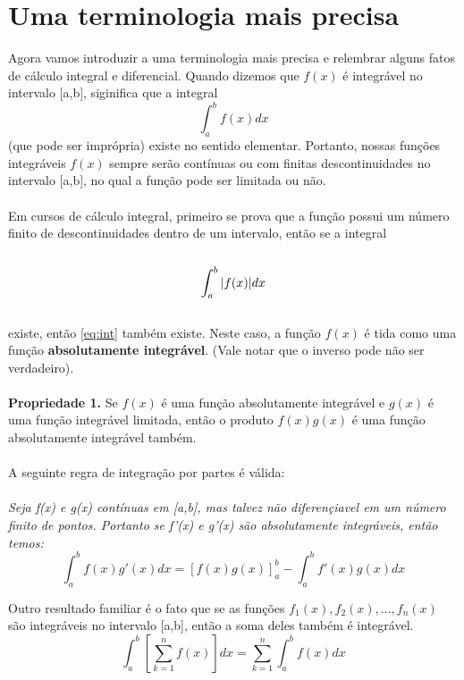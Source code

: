 \chapter{ Uma terminologia mais precisa}
Agora vamos introduzir a uma terminologia mais precisa e relembrar alguns fatos
de cálculo integral e diferencial. Quando dizemos que $f(x)$ é integrável no 
intervalo [a,b], siginifica que a integral\\
\begin{equation}
    \int_{a}^{b}f(x)dx 
\label{eq:int}
\end{equation}
(que pode ser imprópria) existe no sentido elementar. Portanto, nossas funções 
integráveis $f(x)$ sempre serão contínuas ou com finitas descontinuidades no 
intervalo [a,b], no qual a função pode ser limitada ou não.\\
\\
Em cursos de cálculo integral, primeiro se prova que a função possui um número
finito de descontinuidades dentro de um intervalo, então se a integral\\
\\
\begin{equation}
\notag
    \int_{a}^{b}|f(x)|dx 
\end{equation} 
\\
existe, então \ref{eq:int} também existe. Neste caso, a função $f(x)$ é tida como
uma função \textbf{absolutamente integrável}. (Vale notar que o inverso pode não
ser verdadeiro).\\
\\
\textbf{Propriedade 1. }
Se $f(x)$ é uma função absolutamente integrável e $g(x)$ é uma função integrável
limitada, então o produto $f(x)g(x)$ é uma função absolutamente integrável também.
\\
\\
A seguinte regra de integração por partes é válida:\\
\\
\textit{Seja f(x) e g(x) contínuas em [a,b], mas talvez não diferençiavel
em um número finito de pontos. Portanto se f'(x) e g'(x) são absolutamente 
integráveis, então temos:}\\
\begin{equation}
    \int_{a}^{b}f(x)g'(x) dx = [f(x)g(x)]_{a}^{b} - \int_{a}^{b}f'(x)g(x) dx
\end{equation}

Outro resultado familiar é o fato que se as funções $f_1(x), f_2(x), ..., f_n(x)$
são integráveis no intervalo [a,b], então a soma deles também é integrável.\\
\begin{equation}
    \int_{a}^{b}\left[\sum\limits_{k=1}^{n}f(x)\right]dx = \sum\limits_{k=1}^{n}\int_{a}^{b}f(x)dx
\label{eq:43}
\end{equation}

